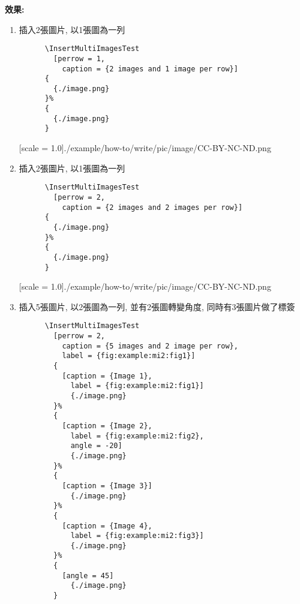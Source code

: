   \newpage

  {\bf 效果:}
  \begin{enumerate}
    \item
    {
      插入2張圖片, 以1張圖為一列
      \begin{verbatim}
      \InsertMultiImagesTest
        [perrow = 1,
          caption = {2 images and 1 image per row}]
      {
        {./image.png}
      }%
      {
        {./image.png}
      }
      \end{verbatim}
      {
        [scale = 1.0]{./example/how-to/write/pic/image/CC-BY-NC-ND.png}
      }
    } %

    \item
    {
      插入2張圖片, 以1張圖為一列
      \begin{verbatim}
      \InsertMultiImagesTest
        [perrow = 2,
          caption = {2 images and 2 images per row}]
      {
        {./image.png}
      }%
      {
        {./image.png}
      }
      \end{verbatim}
      {
        [scale = 1.0]{./example/how-to/write/pic/image/CC-BY-NC-ND.png}
      }
    } %

    \newpage
    \item
    {
      插入5張圖片, 以2張圖為一列, 並有2張圖轉變角度, 同時有3張圖片做了標簽
      \begin{verbatim}
      \InsertMultiImagesTest
        [perrow = 2,
          caption = {5 images and 2 image per row},
          label = {fig:example:mi2:fig1}]
        {
          [caption = {Image 1},
            label = {fig:example:mi2:fig1}]
            {./image.png}
        }%
        {
          [caption = {Image 2},
            label = {fig:example:mi2:fig2},
            angle = -20]
            {./image.png}
        }%
        {
          [caption = {Image 3}]
            {./image.png}
        }%
        {
          [caption = {Image 4},
            label = {fig:example:mi2:fig3}]
            {./image.png}
        }%
        {
          [angle = 45]
            {./image.png}
        }
      \end{verbatim}

}
\end{enumerate}
